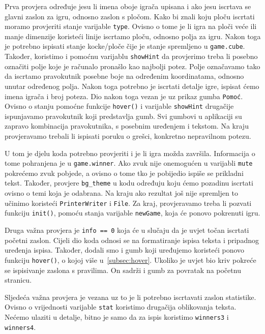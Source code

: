 \documentclass[12pt]{scrartcl}
\begin{document}
Prva provjera određuje jesu li imena oboje igrača upisana i ako jesu iscrtava se glavni zaslon za igru, odnosno zaslon s pločom. Kako bi znali koju ploču iscrtati moramo provjeriti stanje varijable \texttt{type}. Ovisno o tome je li igra na ploči veće ili manje dimenzije koristeći linije iscrtamo ploču, odnosno polja za igru. Nakon toga je potrebno ispisati stanje kocke/ploče čije je stanje spremljeno u \texttt{game.cube}. Također, koristimo i pomoćnu varijablu \texttt{showHint} da provjerimo treba li posebno označiti polje koje je računalo pronašlo kao najbolji potez. Polje označavamo tako da iscrtamo pravokutnik posebne boje na određenim koordinatama, odnosno unutar određenog polja. Nakon toga potrebno je iscrtati detalje igre, ispisat ćemo imena igrača i broj poteza. Dio nakon toga vezan je uz prikaz gumba \texttt{Pomoć}. Ovisno o stanju pomoćne funkcije \texttt{hover()} i varijable \texttt{showHint} drugačije ispunjavamo pravokutnik koji predstavlja gumb. Svi gumbovi u aplikaciji su zapravo kombinacija pravokutnika, s posebnim uređenjem i tekstom. Na kraju provjeravamo trebali li ispisati poruku o grešci, konkretno nepravilnom potezu.

U tom je djelu koda potrebno provjeriti i je li igra možda završila. Informacija o tome pohranjena je u \texttt{game.winner}. Ako zvuk nije onemogućen u varijabli \texttt{mute} pokrećemo zvuk pobjede, a ovisno o tome tko je pobijedio ispiše se prikladni tekst. Također, provjere \texttt{bg\_theme} u kodu određuju koju ćemo pozadinu iscrtati ovisno o temi koja je odabrana. Na kraju ako rezultat još nije spremljen to učinimo koristeći \texttt{PrinterWriter} i \texttt{File}. Za kraj, provjeravamo treba li pozvati funkciju \texttt{init()}, pomoću stanja varijable \texttt{newGame}, koja će ponovo pokrenuti igru. 

Druga važna provjera je \texttt{info == 0} koja će u slučaju da je uvjet točan iscrtati početni zaslon. Cijeli dio koda odnosi se na formatiranje ispisa teksta i pripadnog uređenja ispisa. Također, dodali smo i gumb koji uređujemo koristeći ponovo funkciju \texttt{hover()}, o kojoj više u~\ref{subsec:hover}. Ukoliko je uvjet bio kriv pokreće se ispisivanje zaslona s pravilima. On sadrži i gumb za povratak na početnu stranicu.

Sljedeća važna provjera je vezana uz to je li potrebno iscrtavati zaslon statistike. Ovisno o vrijednosti varijable \texttt{stat} koristimo drugačija oblikovanja teksta. Nećemo ulaziti u detalje, bitno je samo da za ispis koristimo \texttt{winners3} i \texttt{winners4}.
 
\end{document}
